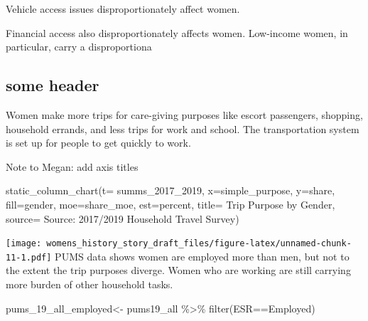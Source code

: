 \documentclass[
  12pt,
]{article}
\newenvironment{Shaded}{\begin{snugshade}}{\end{snugshade}}
\newcommand{\AttributeTok}[1]{\textcolor[rgb]{0.77,0.63,0.00}{#1}}
\newcommand{\FunctionTok}[1]{\textcolor[rgb]{0.00,0.00,0.00}{#1}}
\newcommand{\NormalTok}[1]{#1}
\newcommand{\OtherTok}[1]{\textcolor[rgb]{0.56,0.35,0.01}{#1}}
\newcommand{\SpecialCharTok}[1]{\textcolor[rgb]{0.00,0.00,0.00}{#1}}
\newcommand{\StringTok}[1]{\textcolor[rgb]{0.31,0.60,0.02}{#1}}
\begin{document}
\begin{flushleft}
\begin{flushleft}
Vehicle access issues disproportionately affect women. 

Financial access also disproportionately
affects women. Low-income women, in
particular, carry a disproportiona

\end{flushleft}

\hypertarget{some-header}{%
\subsection{some header}\label{some-header}}

\begin{flushleft}
Women make more trips for care-giving purposes like escort passengers, shopping, household errands, and less trips for work and school. 
The transportation system is set up for people to get quickly to work.


\end{flushleft}

Note to Megan: add axis titles

\begin{Shaded}
\begin{Highlighting}[]
\FunctionTok{static\_column\_chart}\NormalTok{(}\AttributeTok{t=}\NormalTok{ summs\_2017\_2019, }\AttributeTok{x=}\StringTok{\textquotesingle{}simple\_purpose\textquotesingle{}}\NormalTok{, }\AttributeTok{y=}\StringTok{\textquotesingle{}share\textquotesingle{}}\NormalTok{,  }\AttributeTok{fill=}\StringTok{\textquotesingle{}gender\textquotesingle{}}\NormalTok{, }\AttributeTok{moe=}\StringTok{\textquotesingle{}share\_moe\textquotesingle{}}\NormalTok{, }\AttributeTok{est=}\StringTok{\textquotesingle{}percent\textquotesingle{}}\NormalTok{, }\AttributeTok{title=} \StringTok{\textquotesingle{}Trip Purpose by Gender\textquotesingle{}}\NormalTok{, }\AttributeTok{source=} \StringTok{\textquotesingle{}Source: 2017/2019 Household Travel Survey\textquotesingle{}}\NormalTok{)}
\end{Highlighting}
\end{Shaded}

\texttt{[image: womens\_history\_story\_draft\_files/figure-latex/unnamed-chunk-11-1.pdf]}
PUMS data shows women are employed more than men, but not to the extent
the trip purposes diverge. Women who are working are still carrying more
burden of other household tasks.

\begin{Shaded}
\begin{Highlighting}[]
\NormalTok{pums\_19\_all\_employed}\OtherTok{\textless{}{-}}\NormalTok{ pums19\_all }\SpecialCharTok{\%\textgreater{}\%} \FunctionTok{filter}\NormalTok{(ESR}\SpecialCharTok{==}\StringTok{\textquotesingle{}Employed\textquotesingle{}}\NormalTok{) }



\end{Highlighting}
\end{Shaded}
\end{flushleft}
\end{document}
